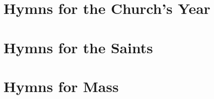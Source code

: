 \def\tabmark{Seasonal Hymns}

\chapter{Hymns for the Church's Year}












\newpage










\newpage


%


\def\tabmark{Saints' Hymns}
\chapter{Hymns for the Saints}




\newpage



\def\tabmark{General Hymns}
\chapter{Hymns for Mass}





%

\vfill

